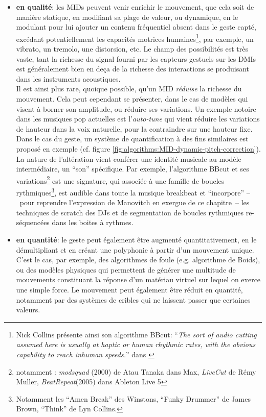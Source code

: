 \begin{itemize}[noitemsep]
	\item \textbf{en qualité}: les MIDs peuvent venir enrichir le mouvement, que cela soit de manière statique, en modifiant sa plage de valeur, ou dynamique, en le modulant pour lui ajouter un contenu fréquentiel absent dans le geste capté, excédant potentiellement les capacités motrices humaines\footnote{Nick Collins présente ainsi son algorithme BBcut: ``\textit{The sort of audio cutting assumed here is usually at haptic or human rhythmic rates, with the obvious capability to reach inhuman speeds.}'' dans \cite{collins_bbcut_2002}}, par exemple, un vibrato, un tremolo, une distorsion, etc. Le champ des possibilités est très vaste, tant la richesse du signal fourni par les capteurs gestuels sur les \glspl{DMI} est généralement bien en deça de la richesse des interactions se produisant dans les instruments acoustiques.\\
	\indent Il est ainsi plus rare, quoique possible, qu'un MID \textit{réduise} la richesse du mouvement. Cela peut cependant se présenter, dans le cas de modèles qui visent à borner son amplitude, ou réduire ses variations. Un exemple notoire dans les musiques pop actuelles est l'\textit{auto-tune} qui vient réduire les variations de hauteur dans la voix naturelle, pour la contraindre sur une hauteur fixe. Dans le cas du geste, un système de quantification à des fins similaires est proposé en exemple (cf. figure \ref{fig:algorithms:MID-dynamic-pitch-correction}).\\
	\indent La nature de l'altération vient conférer une identité musicale au modèle intermédiaire, un ``son'' spécifique. Par exemple, l'algorithme BBcut \cite{collins_bbcut_2002} et ses variations\footnote{notamment : \textit{modsquad} (2000) de Atau Tanaka dans Max, \textit{LiveCut} de Rémy Muller, \textit{BeatRepeat}(2005) dans Ableton Live 5} est une signature, qui associée à une famille de boucles rythmiques\footnote{Notamment les ``Amen Break'' des Winstons, ``Funky Drummer'' de James Brown, ``Think'' de Lyn Collins.}, est audible dans toute la musique breakbeat et ``incorpore'' --~pour reprendre l'expression de Manovitch en exergue de ce chapitre~-- les techniques de scratch des DJs et de segmentation de boucles rythmiques re-séquencées dans les boites à rythmes.

	\item \textbf{en quantité}: le geste peut également être augmenté quantitativement, en le démultipliant et en créant une polyphonie à partir d'un mouvement unique. C'est le cas, par exemple, des algorithmes de foule (e.g. algorithme de Boids), ou des modèles physiques qui permettent de générer une multitude de mouvements constituant la réponse d'un matériau virtuel sur lequel on exerce une simple force. Le mouvement peut également être réduit en quantité, notamment par des systèmes de cribles qui ne laissent passer que certaines valeurs.
	

\end{itemize}
